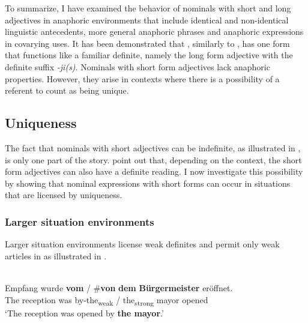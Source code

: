\documentclass[output=paper,
modfonts
]{langscibook}
\begin{document}
To summarize, I have examined the behavior of nominals with short and long adjectives in anaphoric environments that include identical and non-identical linguistic antecedents, more general anaphoric phrases and anaphoric expressions in covarying uses. It has been demonstrated that , similarly to , has one form that functions like a familiar definite, namely the long form adjective with the definite suffix \textit{-ji(s)}. Nominals with short form adjectives lack anaphoric properties. However, they arise in contexts where there is a possibility of a referent to count as being unique. 

\subsection{Uniqueness} \label{sec:sereikaite:4.3}

The fact that nominals with short adjectives can be indefinite, as illustrated in , is only one part of the story. \citet{GillonArmoskaite2015} point out that, depending on the context, the short form adjectives can also have a definite reading. I now investigate this possibility by showing that nominal expressions with short forms can occur in situations that are licensed by uniqueness.

\subsubsection{Larger situation environments}

Larger situation environments \citep{Hawkins1978} license weak definites and permit only weak articles in  as illustrated in .

\begin{exe}
	\ex \label{ex:sereikaite:45}
	 \citep[31]{Schwarz2009} \\
	 {Empfang} {wurde} \textbf{vom} \textnormal{/} \textnormal{\#}\textbf{von} \textbf{dem} \textbf{{Bürgermeister}} {eröffnet}.\\
	The reception was {by-the\textsubscript{weak}} / \phantom{\#}{by} {the\textsubscript{strong}} {mayor} opened\\
	\trans `The reception was opened by \textbf{the mayor}.’ 
\end{exe}
\end{document}
